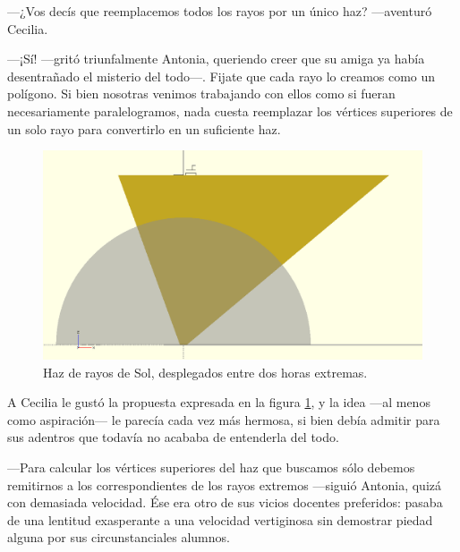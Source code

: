 ---¿Vos decís que reemplacemos todos los rayos por un único haz?
---aventuró Cecilia.

---¡Sí! ---gritó triunfalmente Antonia, queriendo creer que su amiga
ya había desentrañado el misterio del to\-\mbox{do---.} Fijate que cada rayo lo
creamos como un polígono. Si bien nosotras venimos trabajando con
ellos como si fueran necesariamente paralelogramos, nada cuesta
reemplazar los vértices superiores de un solo rayo para convertirlo en
un suficiente haz.


\begin{figure}[ht]
  \centering
  \includegraphics[width=.6\textwidth]{imagenes/haz}
  \caption{Haz de rayos de Sol, desplegados entre dos horas extremas.}
  \label{fig:haz}
\end{figure}


A Cecilia le gustó la propuesta expresada en la figura \ref{fig:haz},
y la idea ---al menos como aspiración--- le parecía cada vez más
hermosa, si bien debía admitir para sus adentros que todavía no
acababa de entenderla del todo.

---Para calcular los vértices superiores del haz que buscamos sólo
debemos remitirnos a los correspondientes de los rayos extremos
---siguió Antonia, quizá con demasiada velocidad. Ése era otro de sus
vicios docentes preferidos: pasaba de una lentitud exasperante a una
velocidad vertiginosa sin demostrar piedad alguna por sus
circunstanciales alumnos.


